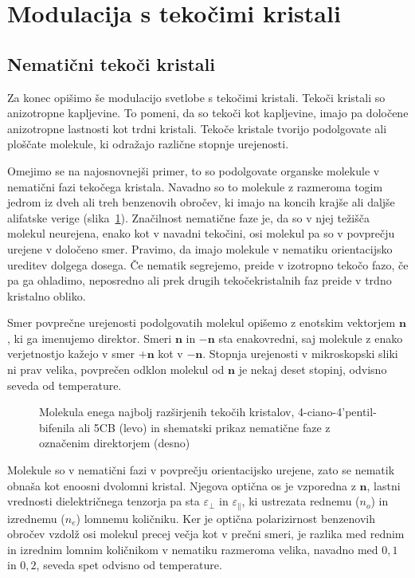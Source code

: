 \section{Modulacija s tekočimi kristali}

\subsection*{Nematični tekoči kristali}
Za konec opišimo še modulacijo svetlobe s tekočimi kristali. 
Tekoči kristali so anizotropne kapljevine. To pomeni, da so tekoči kot 
kapljevine, imajo pa določene anizotropne lastnosti kot trdni kristali. 
Tekoče kristale tvorijo podolgovate ali ploščate molekule, 
ki odražajo različne stopnje urejenosti. 

Omejimo se na najosnovnejši
primer, to so podolgovate organske molekule v nematični fazi tekočega kristala. 
Navadno so to molekule z razmeroma togim jedrom iz
dveh ali treh benzenovih obročev, ki imajo na koncih krajše ali daljše
alifatske verige (slika~\ref{fig:5CB}). Značilnost nematične faze je, da
so v njej težišča molekul neurejena, enako kot v navadni tekočini, 
osi molekul pa so v povprečju urejene v določeno smer. Pravimo, da imajo molekule
v nematiku orientacijsko ureditev dolgega dosega. Če nematik segrejemo,
preide v izotropno tekočo fazo, če pa ga ohladimo, neposredno ali prek drugih
tekočekristalnih faz preide v trdno kristalno obliko. 

Smer povprečne urejenosti podolgovatih molekul opišemo z enotskim vektorjem 
$\mathbf{n}$, ki ga imenujemo direktor. 
Smeri $\mathbf{n}$ in $-\mathbf{n}$ sta 
enakovredni, saj molekule z enako verjetnostjo kažejo v smer $+\mathbf{n}$ kot 
v $-\mathbf{n}$. Stopnja urejenosti v mikroskopski sliki ni prav velika, povprečen
odklon molekul od $\mathbf{n}$ je nekaj deset stopinj, odvisno seveda od temperature.
\begin{figure}[h]
\centering
\def\svgwidth{30truemm} 
\qquad\qquad
\def\svgwidth{50truemm} 

\caption{Molekula enega najbolj razširjenih tekočih kristalov, 4-ciano-4'pentil-bifenila 
ali 5CB (levo) in shematski prikaz nematične faze z označenim direktorjem (desno)}
\label{fig:5CB}
\end{figure}

Molekule so v nematični fazi v povprečju orientacijsko urejene, zato se nematik
obnaša kot enoosni dvolomni kristal. Njegova optična os je vzporedna 
z $\mathbf{n}$, lastni vrednosti dielektričnega tenzorja pa sta $\varepsilon_\bot$ in
$\varepsilon_{\parallel}$, ki ustrezata rednemu ($n_o$) in izrednemu ($n_e$) 
lomnemu količniku.
Ker je optična polarizirnost benzenovih obročev vzdolž osi molekul precej večja kot
v prečni smeri, je razlika med rednim in izrednim lomnim količnikom v nematiku razmeroma 
velika, navadno med $0,1$ in $0,2$, seveda spet odvisno od temperature.

